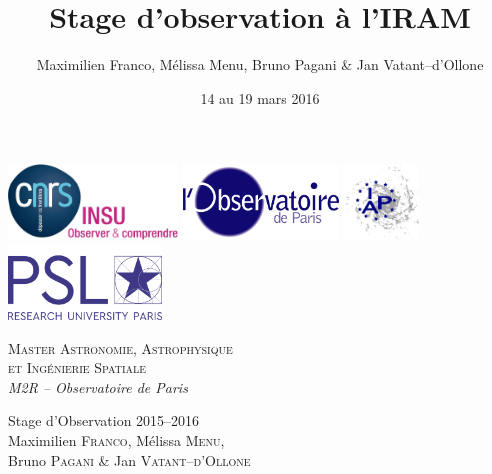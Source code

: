 \documentclass[a4paper,10pt,french]{article}
\title{Stage d’observation à l’IRAM}
\author{Maximilien Franco, Mélissa Menu, Bruno Pagani \& Jan Vatant--d’Ollone}
\date{14 au 19 mars 2016}
\begin{document}
\setlength{\parindent}{0pt}
\thispagestyle{empty}

\includegraphics[height=2cm]{logo_insu.jpg} \hfill
\includegraphics[height=2cm]{logo_obspm.jpg} \hfill
\includegraphics[height=2cm]{logo_iap.jpg} \hfill
\includegraphics[height=2cm]{logo_psl.png}

\vspace{0.5cm}

\noindent
\begin{minipage}{.5\textwidth}
    \textsc{Master Astronomie, Astrophysique} \\
    \textsc{et Ingénierie Spatiale} \\
    \textit{M2R – Observatoire de Paris}
\end{minipage}%
\begin{minipage}{.5\textwidth}
    \begin{flushright}
        Stage d’Observation 2015--2016 \\
        Maximilien \textsc{Franco}, Mélissa \textsc{Menu}, \\
        Bruno \textsc{Pagani} \& Jan \textsc{Vatant--d’Ollone}
    \end{flushright}
\end{minipage}
\end{document}
